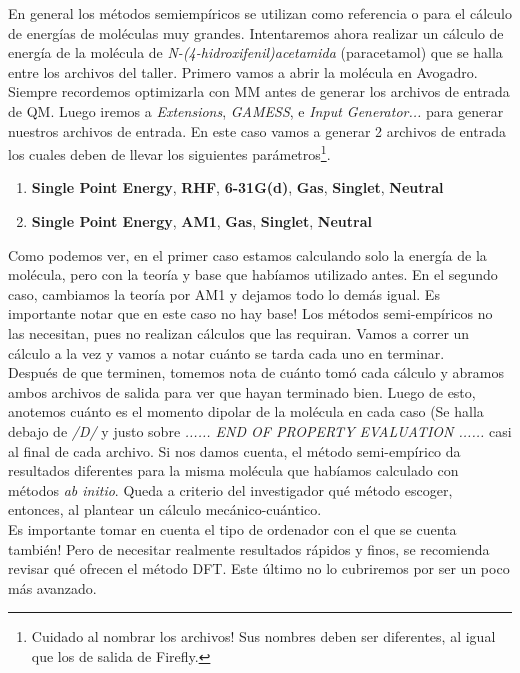 \documentclass[10pt,letterpaper]{article}
\begin{document}
En general los m\'etodos semiemp\'iricos se utilizan como referencia o para el c\'alculo de energ\'ias de mol\'eculas muy grandes. Intentaremos ahora realizar un c\'alculo de energ\'ia de la mol\'ecula de \emph{N-(4-hidroxifenil)acetamida} (paracetamol) que se halla entre los archivos del taller. Primero vamos a abrir la mol\'ecula en Avogadro. Siempre recordemos optimizarla con MM antes de generar los archivos de entrada de QM. Luego iremos a \textit{Extensions}, \textit{GAMESS}, e \textit{Input Generator...} para generar nuestros archivos de entrada. En este caso vamos a generar 2 archivos de entrada los cuales deben de llevar los siguientes par\'ametros\footnote{Cuidado al nombrar los archivos! Sus nombres deben ser diferentes, al igual que los de salida de Firefly.}.

\begin{enumerate}
\item \textbf{Single Point Energy}, \textbf{RHF}, \textbf{6-31G(d)}, \textbf{Gas}, \textbf{Singlet}, \textbf{Neutral}
\item \textbf{Single Point Energy}, \textbf{AM1}, \textbf{Gas}, \textbf{Singlet}, \textbf{Neutral}
\end{enumerate}

Como podemos ver, en el primer caso estamos calculando solo la energ\'ia de la mol\'ecula, pero con la teor\'ia y base que hab\'iamos utilizado antes. En el segundo caso, cambiamos la teor\'ia por AM1 y dejamos todo lo dem\'as igual. Es importante notar que en este caso no hay base! Los m\'etodos semi-emp\'iricos no las necesitan, pues no realizan c\'alculos que las requiran. Vamos a correr un c\'alculo a la vez y vamos a notar cu\'anto se tarda cada uno en terminar.\\

Despu\'es de que terminen, tomemos nota de cu\'anto tom\'o cada c\'alculo y abramos ambos archivos de salida para ver que hayan terminado bien. Luego de esto, anotemos cu\'anto es el momento dipolar de la mol\'ecula en cada caso (Se halla debajo de \textit{/D/} y justo sobre \textit{...... END OF PROPERTY EVALUATION ......} casi al final de cada archivo. Si nos damos cuenta, el m\'etodo semi-emp\'irico da resultados diferentes para la misma mol\'ecula que hab\'iamos calculado con m\'etodos \textit{ab initio}. Queda a criterio del investigador qu\'e m\'etodo escoger, entonces, al plantear un c\'alculo mec\'anico-cu\'antico.\\

Es importante tomar en cuenta el tipo de ordenador con el que se cuenta tambi\'en! Pero de necesitar realmente resultados r\'apidos y finos, se recomienda revisar qu\'e ofrecen el m\'etodo DFT. Este \'ultimo no lo cubriremos por ser un poco m\'as avanzado.
\end{document}
